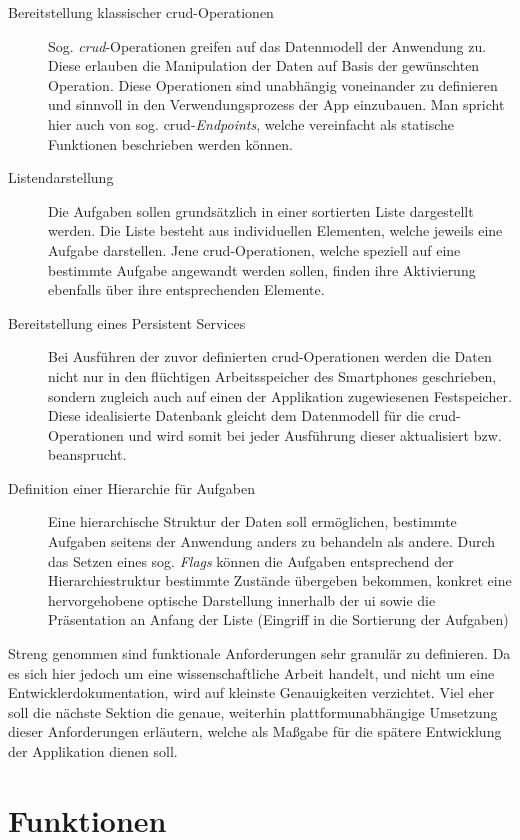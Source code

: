\begin{description}
    \item[Bereitstellung klassischer \acs{crud}-Operationen] Sog. \textit{\ac{crud}}-Operationen greifen auf das Datenmodell der Anwendung zu. Diese erlauben die Manipulation der Daten auf Basis der gewünschten Operation. Diese Operationen sind unabhängig voneinander zu definieren und sinnvoll in den Verwendungsprozess der App einzubauen. Man spricht hier auch von sog. \ac{crud}-\textit{Endpoints}, welche vereinfacht als statische Funktionen beschrieben werden können.
    \item[Listendarstellung] Die Aufgaben sollen grundsätzlich in einer sortierten Liste dargestellt werden. Die Liste besteht aus individuellen Elementen, welche jeweils eine Aufgabe darstellen. Jene \ac{crud}-Operationen, welche speziell auf eine bestimmte Aufgabe angewandt werden sollen, finden ihre Aktivierung ebenfalls über ihre entsprechenden Elemente.
    \item[Bereitstellung eines Persistent Services] Bei Ausführen der zuvor definierten \ac{crud}-Operationen werden die Daten nicht nur in den flüchtigen Arbeitsspeicher des Smartphones geschrieben, sondern zugleich auch auf einen der Applikation zugewiesenen Festspeicher. Diese idealisierte Datenbank gleicht dem Datenmodell für die \ac{crud}-Operationen und wird somit bei jeder Ausführung dieser aktualisiert bzw. beansprucht.
    \item[Definition einer Hierarchie für Aufgaben] Eine hierarchische Struktur der Daten soll ermöglichen, bestimmte Aufgaben seitens der Anwendung anders zu behandeln als andere. Durch das Setzen eines sog. \textit{Flags} können die Aufgaben entsprechend der Hierarchiestruktur bestimmte Zustände übergeben bekommen, konkret eine hervorgehobene optische Darstellung innerhalb der \ac{ui} sowie die Präsentation an Anfang der Liste (Eingriff in die Sortierung der Aufgaben)
\end{description}

Streng genommen sind funktionale Anforderungen sehr granulär zu definieren. Da es sich hier jedoch um eine wissenschaftliche Arbeit handelt, und nicht um eine Entwicklerdokumentation, wird auf kleinste Genauigkeiten verzichtet. Viel eher soll die nächste Sektion die genaue, weiterhin plattformunabhängige Umsetzung dieser Anforderungen erläutern, welche als Maßgabe für die spätere Entwicklung der Applikation dienen soll. 

\section{Funktionen}

